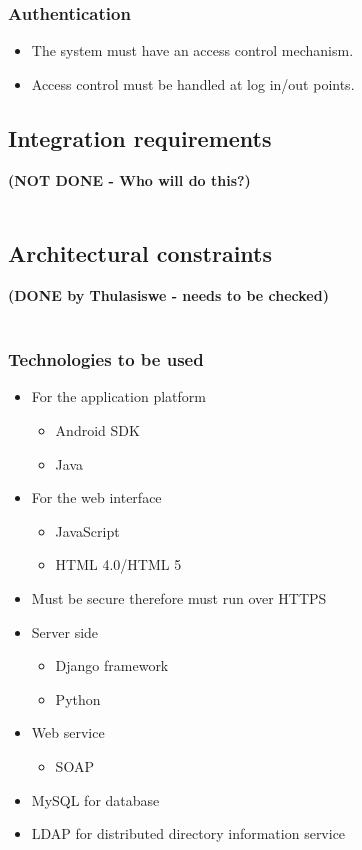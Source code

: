 \documentclass[11pt,a4paper]{article}
\begin{document}
	\subsubsection{Authentication}
	\begin{itemize}
	\item The system must have an access control mechanism.
	\item Access control must be handled at log in/out points.
	\end{itemize}


\subsection{Integration requirements}
\textbf{(NOT DONE - Who will do this?)}\\ \\



\subsection{Architectural constraints}
\textbf{(DONE by Thulasiswe - needs to be checked)}\\ \\
\subsubsection{Technologies to be used}
	\begin{itemize}
	\item For the application platform
	\begin{itemize}
	\item Android SDK
	\item Java
	\end{itemize}
	\item For the web interface
	\begin{itemize}
	\item JavaScript
	\item HTML 4.0/HTML 5
	\end{itemize}
	\item Must be secure therefore must run over HTTPS
	\item Server side
	\begin{itemize}
	\item Django framework
	\item Python
	\end{itemize}
	\item Web service
	\begin{itemize}
	\item SOAP
	\end{itemize}
	\item MySQL for database
	\item LDAP for distributed directory information service
	\end{itemize}
\end{document}
